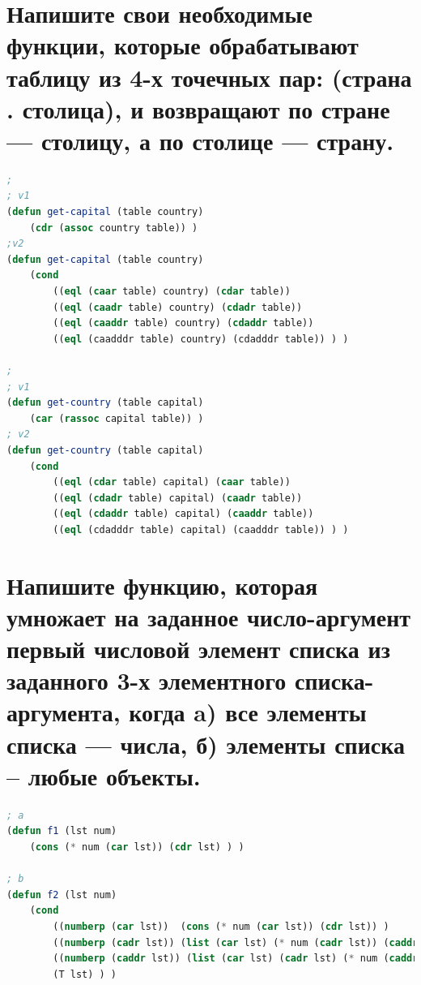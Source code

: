 \documentclass[12pt]{report}
\begin{document}
\section{Напишите свои необходимые функции, которые обрабатывают таблицу из
4-х точечных пар: (страна . столица), и возвращают по стране --- столицу, а по столице --- страну.}

\begin{lstlisting}[language=Lisp]
; 
; v1
(defun get-capital (table country)
    (cdr (assoc country table)) )
;v2
(defun get-capital (table country)
    (cond 
        ((eql (caar table) country) (cdar table))
        ((eql (caadr table) country) (cdadr table)) 
        ((eql (caaddr table) country) (cdaddr table))
        ((eql (caadddr table) country) (cdadddr table)) ) )

;
; v1
(defun get-country (table capital)
    (car (rassoc capital table)) )
; v2
(defun get-country (table capital)
    (cond 
        ((eql (cdar table) capital) (caar table))
        ((eql (cdadr table) capital) (caadr table)) 
        ((eql (cdaddr table) capital) (caaddr table))
        ((eql (cdadddr table) capital) (caadddr table)) ) )
\end{lstlisting}


\section{Напишите функцию, которая умножает на заданное число-аргумент
первый числовой элемент списка из заданного 3-х элементного списка-аргумента, когда a) все элементы списка --- числа, б) элементы списка -- любые объекты.}

\begin{lstlisting}[language=Lisp]
; a
(defun f1 (lst num)
    (cons (* num (car lst)) (cdr lst) ) )

; b
(defun f2 (lst num)
    (cond 
        ((numberp (car lst))  (cons (* num (car lst)) (cdr lst)) )
        ((numberp (cadr lst)) (list (car lst) (* num (cadr lst)) (caddr lst)) )
        ((numberp (caddr lst)) (list (car lst) (cadr lst) (* num (caddr lst))) )
        (T lst) ) )
\end{lstlisting}



	
\end{document}
